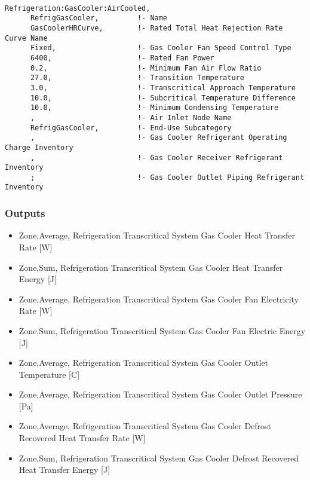 \begin{lstlisting}

Refrigeration:GasCooler:AirCooled,
      RefrigGasCooler,         !- Name
      GasCoolerHRCurve,        !- Rated Total Heat Rejection Rate Curve Name
      Fixed,                   !- Gas Cooler Fan Speed Control Type
      6400,                    !- Rated Fan Power
      0.2,                     !- Minimum Fan Air Flow Ratio
      27.0,                    !- Transition Temperature
      3.0,                     !- Transcritical Approach Temperature
      10.0,                    !- Subcritical Temperature Difference
      10.0,                    !- Minimum Condensing Temperature
      ,                        !- Air Inlet Node Name
      RefrigGasCooler,         !- End-Use Subcategory
      ,                        !- Gas Cooler Refrigerant Operating Charge Inventory
      ,                        !- Gas Cooler Receiver Refrigerant Inventory
      ;                        !- Gas Cooler Outlet Piping Refrigerant Inventory
\end{lstlisting}

\subsubsection{Outputs}\label{outputs-10-006}

\begin{itemize}
\item
  Zone,Average, Refrigeration Transcritical System Gas Cooler Heat Transfer Rate {[}W{]}
\item
  Zone,Sum, Refrigeration Transcritical System Gas Cooler Heat Transfer Energy {[}J{]}
\item
  Zone,Average, Refrigeration Transcritical System Gas Cooler Fan Electricity Rate {[}W{]}
\item
  Zone,Sum, Refrigeration Transcritical System Gas Cooler Fan Electric Energy {[}J{]}
\item
  Zone,Average, Refrigeration Transcritical System Gas Cooler Outlet Temperature {[}C{]}
\item
  Zone,Average, Refrigeration Transcritical System Gas Cooler Outlet Pressure {[}Pa{]}
\item
  Zone,Average, Refrigeration Transcritical System Gas Cooler Defrost Recovered Heat Transfer Rate {[}W{]}
\item
  Zone,Sum, Refrigeration Transcritical System Gas Cooler Defrost Recovered Heat Transfer Energy {[}J{]}
\end{itemize}

